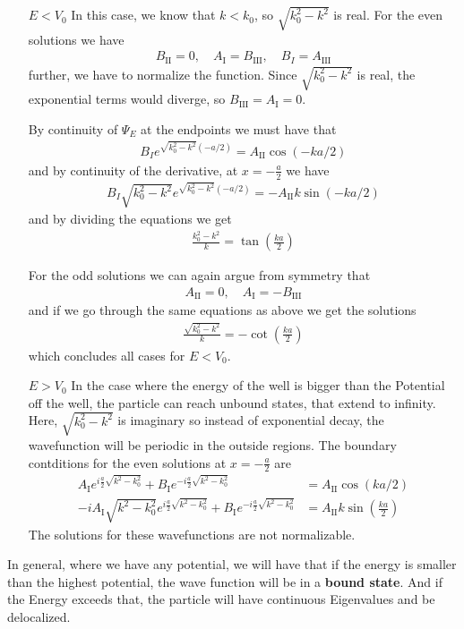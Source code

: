 \begin{itemize}
	\item[$E < V_0$] In this case, we know that $k < k_0$, so $\sqrt{k_0^2 - k^2}$ is real.
	For the even solutions we have
	\begin{align*}
		B_{\text{II}} = 0, \quad A_{\text{I}} = B_{\text{III}}, \quad B_I = A_{\text{III}}
	\end{align*}
	further, we have to normalize the function. Since $\sqrt{k_0^2 - k^2}$ is real, the exponential terms would diverge, so $B_{\text{III}} = A_{\text{I}} = 0$.

	By continuity of $\Psi_E$ at the endpoints we must have that
	\begin{align*}
		B_I e^{\sqrt{k_0^2 - k^2}(-a/2)} = A_{\text{II}} \cos(-ka/2)
	\end{align*}
	and by continuity of the derivative, at $x = -\frac{a}{2}$ we have
	\begin{align*}
		B_I \sqrt{k_0^2 - k^2} e^{\sqrt{k_0^2 - k^2}(-a/2)} = - A_{\text{II}}k \sin(-ka/2)
	\end{align*}
	and by dividing the equations we get
	\begin{align*}
		\frac{k_0^2 - k^2}{k} = \tan\left(\frac{ka}{2}\right)
	\end{align*}

	For the odd solutions we can again argue from symmetry that
	\begin{align*}
		A_{\text{II}} = 0, \quad A_{\text{I}} = -B_{\text{III}}
	\end{align*}
	and if we go through the same equations as above we get the solutions
	\begin{align*}
		\frac{\sqrt{k_0^2 - k^2}}{k} = - \cot\left(\frac{ka}{2}\right)
	\end{align*}
	which concludes all cases for $E < V_0$.

	
	\item[$E> V_0$] In the case where the energy of the well is bigger than the Potential off the well, the particle can reach unbound states, that extend to infinity. 
		Here, $\sqrt{k_0^{2}-k^{2}}$ is imaginary so instead of exponential decay, the wavefunction will be periodic in the outside regions.
		The boundary contditions for the even solutions at $x = -\frac{a}{2}$ are
		\begin{align*}
			A_{\text{I}} e^{i \frac{a}{2} \sqrt{k^{2}-k_0^{2}}} 
			+ 
			B_{\text{I}} e^{-i \frac{a}{2}\sqrt{k^{2}-k_0^{2}}} &= A_{\text{II}} \cos(ka/2)\\
				-iA_{\text{I}}\sqrt{k^{2}-k_0^{2}}e^{i \frac{a}{2}\sqrt{k^{2}-k_0^{2}}} + B_{\text{I}}e^{-i \frac{a}{2}\sqrt{k^{2}- k_0^{2}}} &= A_{\text{II}}k \sin\left(\frac{ka}{2}\right)
		\end{align*}
		The solutions for these wavefunctions are not normalizable.
\end{itemize}
In general, where we have any potential, we will have that if the energy is smaller than the highest potential, the wave function will be in a \textbf{bound state}. 
And if the Energy exceeds that, the particle will have continuous Eigenvalues and be delocalized.




